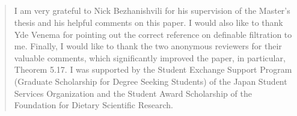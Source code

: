 \documentclass[a4paper,11pt]{article}
\theoremstyle{definition}
\theoremstyle{remark}
\numberwithin{theorem}{section}
\newenvironment{acknowledgements}{%
  \renewcommand{\abstractname}{Acknowledgements}%
  \begin{abstract}
}{%
  \end{abstract}
}
\begin{document}
\subsection*{}
\begin{acknowledgements}
I am very grateful to Nick Bezhanishvili for his supervision of the Master's thesis and his helpful comments on this paper. I would also like to thank Yde Venema for pointing out the correct reference on definable filtration to me. Finally, I would like to thank the two anonymous reviewers for their valuable comments, which significantly improved the paper, in particular, Theorem 5.17. I was supported by the Student Exchange Support Program (Graduate Scholarship for Degree Seeking Students) of the Japan Student Services Organization and the Student Award Scholarship of the Foundation for Dietary Scientific Research.
    
\end{acknowledgements}

\printbibliography[heading=bibintoc,title=References]
\end{document}

